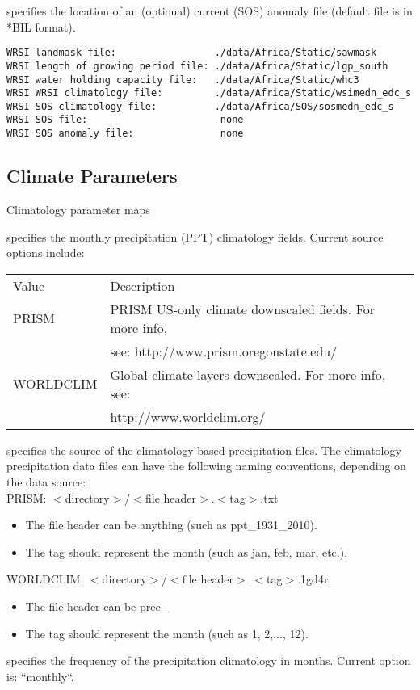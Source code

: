   specifies the 
   location of an (optional) current (SOS) anomaly file
   (default file is in *BIL format).
 

 \begin{Verbatim}[frame=single]
WRSI landmask file:                 ./data/Africa/Static/sawmask
WRSI length of growing period file: ./data/Africa/Static/lgp_south
WRSI water holding capacity file:   ./data/Africa/Static/whc3
WRSI WRSI climatology file:         ./data/Africa/Static/wsimedn_edc_s
WRSI SOS climatology file:          ./data/Africa/SOS/sosmedn_edc_s
WRSI SOS file:                       none
WRSI SOS anomaly file:               none
 \end{Verbatim}

 
 \subsection{Climate Parameters} \label{ssec:climparams}
 

 
 Climatology parameter maps

  specifies the monthly
 precipitation (PPT) climatology fields.
 Current source options include:

 \begin{tabular}{ll}
 Value       & Description               \\
 PRISM       & PRISM US-only climate downscaled fields. For more info, \\
             &  see:  http://www.prism.oregonstate.edu/   \\
 WORLDCLIM   & Global climate layers downscaled.  For more info, see:  \\
             &  http://www.worldclim.org/ \\
 \end{tabular}

  specifies the source of the climatology
 based precipitation files.  The climatology precipitation data
 files can have the following naming conventions, depending
 on the data source: \\

 PRISM: $<$directory$>$/$<$file header$>$.$<$tag$>$.txt
 \begin{itemize} 
 \item[] The file header can be anything (such as ppt\_1931\_2010).
 \item[] The tag should represent the month
         (such as jan, feb, mar, etc.).
 \end{itemize} 
 WORLDCLIM:  $<$directory$>$/$<$file header$>$.$<$tag$>$.1gd4r
 \begin{itemize} 
 \item[] The file header can be prec\_
 \item[] The tag should represent the month (such as 1, 2,..., 12).
 \end{itemize} 
  specifies the frequency of the
 precipitation climatology in months.  Current option is: ``monthly``.
 

